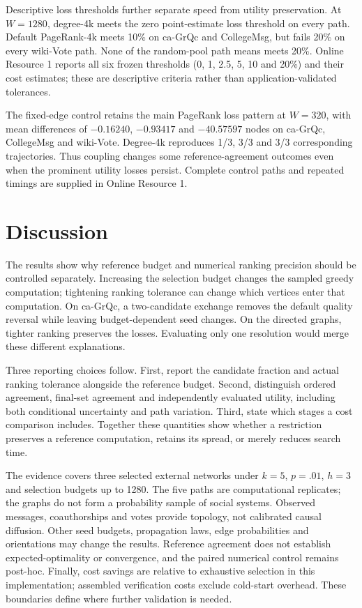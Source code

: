\documentclass[smallextended]{svjour3}
\begin{document}
Descriptive loss thresholds further separate speed from utility preservation. At $W=1280$, degree-4k meets the zero point-estimate loss threshold on every path. Default PageRank-4k meets 10\% on ca-GrQc and CollegeMsg, but fails 20\% on every wiki-Vote path. None of the random-pool path means meets 20\%. Online Resource 1 reports all six frozen thresholds (0, 1, 2.5, 5, 10 and 20\%) and their cost estimates; these are descriptive criteria rather than application-validated tolerances.

The fixed-edge control retains the main PageRank loss pattern at $W=320$, with mean differences of $-0.16240$, $-0.93417$ and $-40.57597$ nodes on ca-GrQc, CollegeMsg and wiki-Vote. Degree-4k reproduces 1/3, 3/3 and 3/3 corresponding trajectories. Thus coupling changes some reference-agreement outcomes even when the prominent utility losses persist. Complete control paths and repeated timings are supplied in Online Resource 1.
\FloatBarrier

\section{Discussion}
The results show why reference budget and numerical ranking precision should be controlled separately. Increasing the selection budget changes the sampled greedy computation; tightening ranking tolerance can change which vertices enter that computation. On ca-GrQc, a two-candidate exchange removes the default quality reversal while leaving budget-dependent seed changes. On the directed graphs, tighter ranking preserves the losses. Evaluating only one resolution would merge these different explanations.

Three reporting choices follow. First, report the candidate fraction and actual ranking tolerance alongside the reference budget. Second, distinguish ordered agreement, final-set agreement and independently evaluated utility, including both conditional uncertainty and path variation. Third, state which stages a cost comparison includes. Together these quantities show whether a restriction preserves a reference computation, retains its spread, or merely reduces search time.

The evidence covers three selected external networks under $k=5$, $p=.01$, $h=3$ and selection budgets up to 1280. The five paths are computational replicates; the graphs do not form a probability sample of social systems. Observed messages, coauthorships and votes provide topology, not calibrated causal diffusion. Other seed budgets, propagation laws, edge probabilities and orientations may change the results. Reference agreement does not establish expected-optimality or convergence, and the paired numerical control remains post-hoc. Finally, cost savings are relative to exhaustive selection in this implementation; assembled verification costs exclude cold-start overhead. These boundaries define where further validation is needed.
\end{document}
